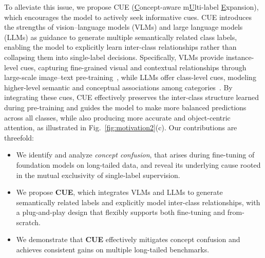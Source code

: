 To alleviate this issue, we propose CUE (\underline{C}oncept-aware m\underline{U}lti-label \underline{E}xpansion), which encourages the model to actively seek informative cues.  CUE introduces the strengths of vision–language models (VLMs) and large language models (LLMs) as guidance to generate multiple semantically related class labels, enabling the model to explicitly learn inter-class relationships rather than collapsing them into single-label decisions. Specifically, VLMs provide instance-level cues, capturing fine-grained visual and contextual relationships through large-scale image–text pre-training~\cite{radford2021learning,jia2021scaling}, while LLMs offer class-level cues, modeling higher-level semantic and conceptual associations among categories~\cite{brown2020language,bommasani2021opportunities}. By integrating these cues, CUE effectively preserves the inter-class structure learned during pre-training and guides the model to make more balanced predictions across all classes, while also producing more accurate and object-centric attention, as illustrated in Fig.~\ref{fig:motivation2}(c). Our contributions are threefold:
\vspace{0.5em}
\begin{itemize}
    \item We identify and analyze \textit{concept confusion}, that arises during fine-tuning of foundation models on long-tailed data, and reveal its underlying cause rooted in the mutual exclusivity of single-label supervision.
    \item We propose \textbf{CUE}, which integrates VLMs and LLMs to generate semantically related labels and explicitly model inter-class relationships, with a plug-and-play design that flexibly supports both fine-tuning and from-scratch.
    \item We demonstrate that \textbf{CUE} effectively mitigates concept confusion and achieves consistent gains on multiple long-tailed benchmarks.  
\end{itemize}




    
